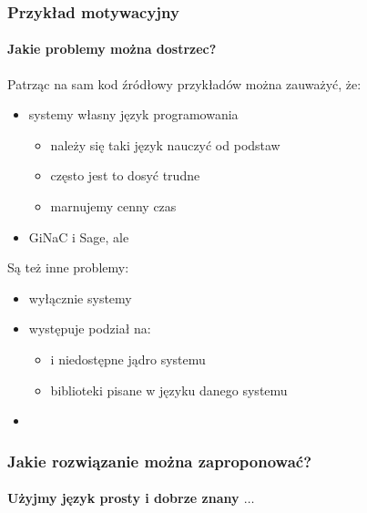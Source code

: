 \documentclass{beamer}
\begin{document}
\begin{frame}
    \frametitle{Przykład motywacyjny}
    \framesubtitle{Jakie problemy można dostrzec?}

    Patrząc na sam kod źródłowy przykładów można zauważyć, że:
    \begin{itemize}
        \item systemy  własny język programowania
            \begin{itemize}
                \item należy się taki język nauczyć od podstaw
                \item często jest to dosyć trudne
                \item marnujemy cenny czas
            \end{itemize}
            \pause
        \item {} GiNaC i Sage, ale \structure{$\ldots$}
    \end{itemize}
    \pause
    Są też inne problemy:
    \begin{itemize}
        \item wyłącznie systemy 
        \item występuje podział na:
            \begin{itemize}
                \item {} i niedostępne jądro systemu
                \item biblioteki pisane w języku danego systemu
            \end{itemize}
        \item \structure{$\ldots$}
    \end{itemize}
\end{frame}

\begin{frame}[fragile]
    \frametitle{Jakie rozwiązanie można zaproponować?}
    \framesubtitle{Użyjmy język prosty i dobrze znany $\ldots$}

    
\end{frame}
\end{document}
